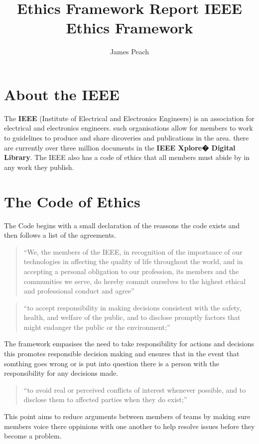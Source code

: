 \documentclass[11pt]{article}
\author{James Peach}
\begin{document}
\title{Ethics Framework Report \textbf{IEEE Ethics Framework}}
\maketitle

\section{About the IEEE}
The \textbf{IEEE} (Institute of Electrical and Electronics Engineers) is an
association for electrical and electronics engineers. such organisations allow
for members to work to guidelines to produce and share dicoveries and
publications in the area. there are currently over three million documents in
the \textbf{IEEE Xplore� Digital Library}. The IEEE also has a code of ethics that
all members must abide by in any work they publish.

  
\section{The Code of Ethics}
The Code begins with a small declaration of the reassons the code exists and
then follows a list of the agreements.
\begin{quotation}
  ``We, the members of the IEEE, in recognition of the importance
  of our technologies in affecting the quality of life throughout the world, and in accepting 
  a personal obligation to our profession, its members and the
  communities we serve, do hereby commit ourselves to the highest ethical and
  professional conduct and agree''
\end{quotation}

\begin{quotation}
  ``to accept responsibility in making decisions consistent with
  the safety, health, and welfare of the public, and to disclose promptly factors
  that might endanger the public or the environment;''
\end{quotation}
The framework empasises the need to take responsibility for actions and
decisions this promotes responsible decision making and ensures that in the
event that somthing goes wrong or is put into question there is a person
with the responsibility for any decisions made.

\begin{quotation}
  ``to avoid real or perceived conflicts of interest whenever
  possible, and to disclose them to affected parties when they do exist;''
\end{quotation}
This point aims to reduce arguments between members of teams by making
sure members voice there oppinions with one another to help resolve issues before
they become a problem.
\end{document}
